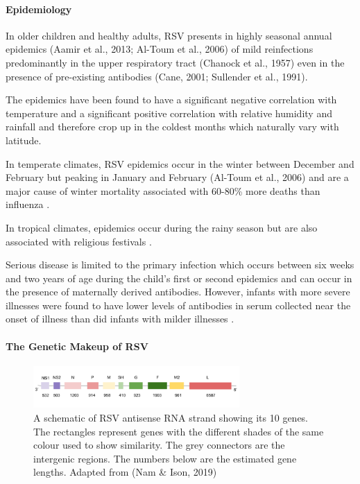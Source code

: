 \documentclass[10pt, a4paper]{article}
\begin{document}
\paragraph{Epidemiology}
\label{sec:org113bf1d}
In older children and healthy adults, RSV presents in highly seasonal annual
epidemics (Aamir et al., 2013; Al-Toum et al., 2006) of mild reinfections
predominantly in the upper respiratory tract (Chanock et al., 1957) even in the
presence of pre-existing antibodies (Cane, 2001; Sullender et al., 1991).

The epidemics have been found to have a significant negative correlation with
temperature and a significant positive correlation with relative humidity and
rainfall \cite{al-toumEpidemiologyClinicalCharacteristics2006}
and therefore crop up in the coldest months which naturally vary with latitude.

In temperate climates, RSV epidemics occur in the winter between December and
February but peaking in January and February  (Al-Toum et al., 2006) and are a
major cause of winter mortality associated with 60-80\% more deaths than
influenza \cite{nicholsonImpactInfluenzaRespiratory1996}.

In tropical climates, epidemics occur during the rainy season
\cite{al-toumEpidemiologyClinicalCharacteristics2006,aamirMolecularCharacterizationCirculating2013} 
but are also associated with religious festivals
\cite{caneMolecularEpidemiologyRespiratory2001}.

Serious disease is limited to the primary infection which occurs between six
weeks and two years of age during the child’s first or second epidemics
\cite{caneMolecularEpidemiologyRespiratory2001} and can occur in the presence of
maternally derived antibodies.
However, infants with more severe illnesses were found to have lower levels of
antibodies in serum collected near the onset of illness than did infants with
milder illnesses 
\cite{glezenRiskRespiratorySyncytial1981,caneMolecularEpidemiologyRespiratory2001}.

\paragraph{The Genetic Makeup of RSV}
\label{sec:org686fe03}
\begin{figure}
\centering
\includegraphics[width=0.7\textwidth]{figures/RSV-genes.png}
\caption{\label{fig:orga526cff}
A schematic of RSV antisense RNA strand showing its 10 genes. The rectangles represent genes with the different shades of the same colour used to show similarity. The grey connectors are the intergenic regions. The numbers below are the estimated gene lengths. Adapted from (Nam \& Ison, 2019)}
\end{figure}
\end{document}
